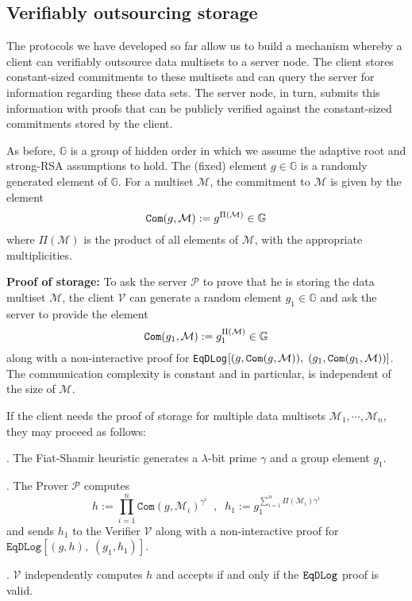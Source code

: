\documentclass[11pt, lettersize, notitlepage, leqno, footskip=0.6cm]{article}
\newcommand{\pl}{\prod\limits}
\newcommand{\slim}{\sum\limits}
\newcommand{\ttt}{\texttt}
\newcommand{\mc}{\mathcal}
\newcommand{\mb}{\mathbb}
\newcommand{\lam}{\lambda}
\newcommand{\mP}{\mc{P}}
\newcommand{\V}{\mc{V}}
\newcommand{\mcM}{\mc{M}}
\newcommand{\vs}{\vspace{-0.15cm}}
\newcommand{\noin}{\noindent}
\numberwithin{equation}{section}
\begin{document}
\subsection{\fontsize{11}{11}\selectfont Verifiably outsourcing storage}

The protocols we have developed so far allow us to build a mechanism whereby a client can verifiably outsource data multisets to a server node. The client stores constant-sized commitments to these multisets and can query the server for information regarding these data sets. The server node, in turn, submits this information with proofs that can  be publicly verified against the constant-sized commitments stored by the client.

As before, $\mb{G}$ is a group of hidden order in which we assume the adaptive root and strong-RSA assumptions to hold. The (fixed) element $g\in\mb{G}$ is a randomly generated element of $\mb{G}$. For a multiset $\mc{M}$, the commitment to $\mc{M}$ is given by the element \vs $$\protect{\verb|Com|}(g, \mc{M}):= g^{\Pi(\mc{M})}\in\mb{G}$$ where $\Pi(\mc{M})$ is the product of all elements of $\mc{M}$, with the appropriate multiplicities. \vspace{0.15cm}

\noin \textbf{Proof of storage:} To ask the server $\mP$ to prove that he is storing the data multiset $\mc{M}$, the client $\V$ can generate a random element $g_1\in\mb{G}$ and ask the server to provide the element \vs $$\protect{\verb|Com|}(g_1, \mc{M}):= g_1^{\Pi(\mc{M})}\in\mb{G}$$ along with a non-interactive proof for \verb|EqDLog|$[(g, \protect{\verb|Com|}(g, \mc{M})),\;(g_1, \protect{\verb|Com|}(g_1, \mc{M}))]$. The communication complexity is constant and in particular, is independent of the size of $\mc{M}$.

If the client needs the proof of storage for multiple data multisets $\mc{M}_1,\cdots,\mc{M}_n$, they may proceed as follows: \vspace{0.1cm}

\noin 1. The Fiat-Shamir heuristic generates a $\lam$-bit prime $\gamma$ and a group element $g_1$.

\noin 2. The Prover $\mP$ computes \vs $$h:= \pl_{i=1}^n \ttt{Com}(g, \mcM_i)^{\gamma^i}\;\;,\;\;h_1:= g_1^{\slim_{i=1}^n \Pi(\mcM_i)\gamma^i}$$ and sends $h_1$ to the Verifier $\V$ along with a non-interactive proof for $\ttt{EqDLog}[(g,h),\;(g_1,h_1)]$.

\noin 3. $\V$ independently computes $h$ and accepts if and only if the $\tt{EqDLog}$ proof is valid.\vspace{0.1cm}
\end{document}
